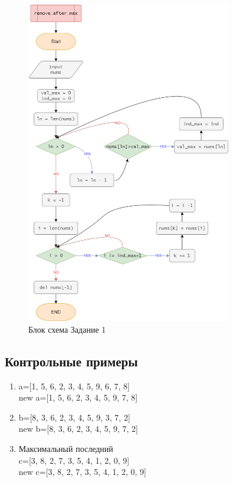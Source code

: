 \begin{figure}[H]
    \centering
    \includegraphics[width=0.8\textwidth]{./flowcharts/first_task.drawio.png}
    \caption{Блок схема Задание 1}
\end{figure}


\subsection{Контрольные примеры}
\begin{enumerate}
    \item a=[1, 5, 6, 2, 3, 4, 5, 9, 6, 7, 8]\\ new a=[1, 5, 6, 2, 3, 4, 5, 9, 7, 8]
    \item b=[8, 3, 6, 2, 3, 4, 5, 9, 3, 7, 2]\\ new b=[8, 3, 6, 2, 3, 4, 5, 9, 7, 2]
    \item Максимальный последний \\ c=[3, 8, 2, 7, 3, 5, 4, 1, 2, 0, 9]\\ new c=[3, 8, 2, 7, 3, 5, 4, 1, 2, 0, 9]
\end{enumerate}



